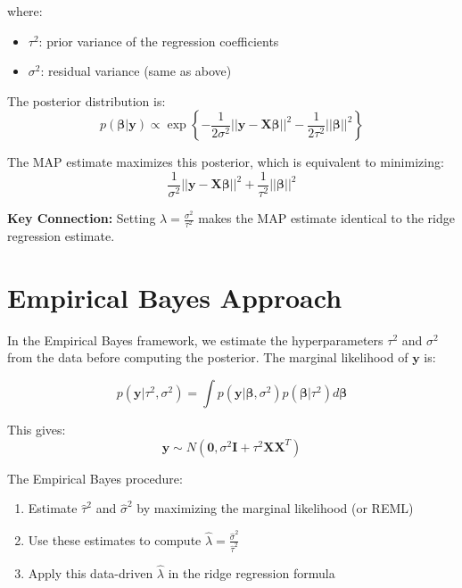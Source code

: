 \documentclass[11pt]{article}
\begin{document}
where:
\begin{itemize}
    \item $\tau^2$: prior variance of the regression coefficients
    \item $\sigma^2$: residual variance (same as above)
\end{itemize}

The posterior distribution is:
\begin{equation}
p(\boldsymbol{\beta}|\mathbf{y}) \propto \exp\left\{-\frac{1}{2\sigma^2}||\mathbf{y} - \mathbf{X}\boldsymbol{\beta}||^2 - \frac{1}{2\tau^2}||\boldsymbol{\beta}||^2\right\}
\end{equation}

The MAP estimate maximizes this posterior, which is equivalent to minimizing:
\begin{equation}
\frac{1}{\sigma^2}||\mathbf{y} - \mathbf{X}\boldsymbol{\beta}||^2 + \frac{1}{\tau^2}||\boldsymbol{\beta}||^2
\end{equation}

\textbf{Key Connection:} Setting $\lambda = \frac{\sigma^2}{\tau^2}$ makes the MAP estimate identical to the ridge regression estimate.

\section{Empirical Bayes Approach}

In the Empirical Bayes framework, we estimate the hyperparameters $\tau^2$ and $\sigma^2$ from the data before computing the posterior. The marginal likelihood of $\mathbf{y}$ is:

\begin{equation}
p(\mathbf{y}|\tau^2, \sigma^2) = \int p(\mathbf{y}|\boldsymbol{\beta}, \sigma^2) p(\boldsymbol{\beta}|\tau^2) d\boldsymbol{\beta}
\end{equation}

This gives:
\begin{equation}
\mathbf{y} \sim N(\mathbf{0}, \sigma^2\mathbf{I} + \tau^2\mathbf{X}\mathbf{X}^T)
\end{equation}

The Empirical Bayes procedure:
\begin{enumerate}
    \item Estimate $\hat{\tau}^2$ and $\hat{\sigma}^2$ by maximizing the marginal likelihood (or REML)
    \item Use these estimates to compute $\hat{\lambda} = \frac{\hat{\sigma}^2}{\hat{\tau}^2}$
    \item Apply this data-driven $\hat{\lambda}$ in the ridge regression formula
\end{enumerate}
\end{document}
